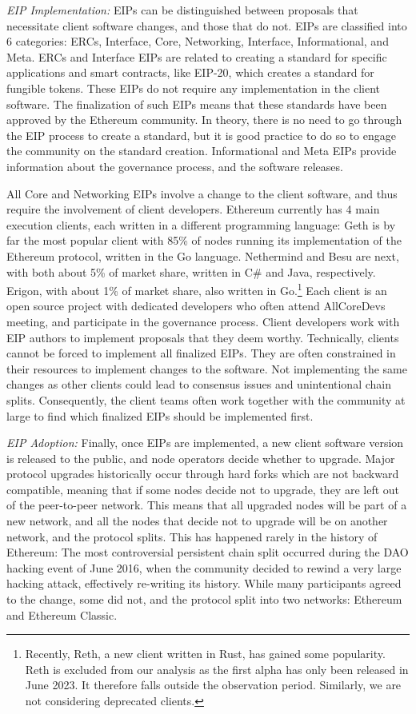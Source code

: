 \documentclass[No]{AEA}
\begin{document}
\textit{EIP Implementation:}  EIPs can be distinguished between proposals that necessitate client software changes, and those that do not. EIPs are classified into 6 categories: ERCs, Interface, Core, Networking, Interface, Informational, and Meta. ERCs and Interface EIPs are related to creating a standard for specific applications and smart contracts, like EIP-20, which creates a standard for fungible tokens. These EIPs do not require any implementation in the client software. The finalization of such EIPs means that these standards have been approved by the Ethereum community. In theory, there is no need to go through the EIP process to create a standard, but it is good practice to do so to engage the community on the standard creation. Informational and Meta EIPs provide information about the governance process, and the software releases. 

All Core and Networking EIPs involve a change to the client software, and thus require the involvement of client developers. Ethereum currently has 4 main execution clients, each written in a different programming language: Geth is by far the most popular client with 85\% of nodes running its implementation of the Ethereum protocol, written in the Go language. Nethermind and Besu are next, with both about 5\% of market share, written in C\# and Java, respectively. Erigon, with about 1\% of market share, also written in Go.\footnote{Recently, Reth, a new client written in Rust, has gained some popularity. Reth is excluded from our analysis as the first alpha has only been released in June 2023. It therefore falls outside the observation period. Similarly, we are not considering deprecated clients.} Each client is an open source project with dedicated developers who often attend AllCoreDevs meeting, and participate in the governance process. Client developers work with EIP authors to implement proposals that they deem worthy. Technically, clients cannot be forced to implement all finalized EIPs. They are often constrained in their resources to implement changes to the software. Not implementing the same changes as other clients could lead to consensus issues and unintentional chain splits. Consequently, the client teams often work together with the community at large to find which finalized EIPs should be implemented first.

\textit{EIP Adoption:} Finally, once EIPs are implemented, a new client software version is released to the public, and node operators decide whether to upgrade. Major protocol upgrades historically occur through hard forks which are not backward compatible, meaning that if some nodes decide not to upgrade, they are left out of the peer-to-peer network. This means that all upgraded nodes will be part of a new network, and all the nodes that decide not to upgrade will be on another network, and the protocol splits. This has happened rarely in the history of Ethereum: The most controversial persistent chain split occurred during the DAO hacking event of June 2016, when the community decided to rewind a very large hacking attack, effectively re-writing its history. While many participants agreed to the change, some did not, and the protocol split into two networks: Ethereum and Ethereum Classic. 
\end{document}
